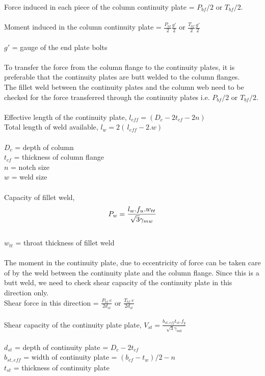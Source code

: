 \documentclass[11.5pt,a4paper,oneside]{report}
\begin{document}
\begin{Form}
\noindent
Force induced in each piece of the column continuity plate = $P_{bf}/2$ \: or \: $T_{bf}/2$.\\
\\
Moment induced in the column continuity plate = $ \frac{P_{bf}} {2}  \frac{g'} {2} $ \: or \: $ \frac{T_{bf}} {2}  \frac{g'} {2} $\\
\\
\indent $g'$ = gauge of the end plate bolts \\ 
\\
\noindent
To transfer the force from the column flange to the continuity plates, it is preferable that the continuity plates are butt welded to the column flanges.
\\
The fillet weld between the continuity plates and the column web need to be checked for the force transferred through the continuity plates i.e. $P_{bf}/2$ \: or \: $T_{bf}/2$.\\
\\
Effective length of the continuity plate, $l_{eff} = ( D_c - 2t_{cf} - 2n )$ \\
Total length of weld available, $l_w = 2(\, l_{eff} - 2.w)$ \\
\\
\indent $D_c$ = depth of column \\ 
\indent $t_{cf}$ = thickness of column flange \\
\indent $n$ = notch size \\
\indent $w$ = weld size \\
\\
Capacity of fillet weld,
\begin{equation}
	P_w = \frac{l_w . f_u . w_{tt}}{\sqrt{3} \gamma_{mw}}\\
\end{equation}
\\
\indent $w_{tt}$ = throat thickness of fillet weld \\
\\
The moment in the continuity plate, due to eccentricity of force can be taken care of by the weld between the continuity plate and the column flange. Since this is a butt weld, we need to check shear capacity of the continuity plate in this direction only.
\\
Shear force in this direction = $ \frac{P_{bf} \: e}{2 d_{st}} $ \: or \: $ \frac{T_{bf} \: e} {2 d_{st}} $\\
\\
Shear capacity of the continuity plate plate, $V_{st} = \frac{b_{st,eff} t_{st} . f_y}{\sqrt{3} \gamma_{m0}}$\\
\\
\indent $d_{st}$ = depth of continuity plate = $D_c - 2t_{cf}$ \\
\indent $b_{st,eff}$ = width of continuity plate = $(b_{cf} - t_w)/2 - n$ \\
\indent $t_{st}$ = thickness of continuity plate \\



\end{Form}
\end{document}
